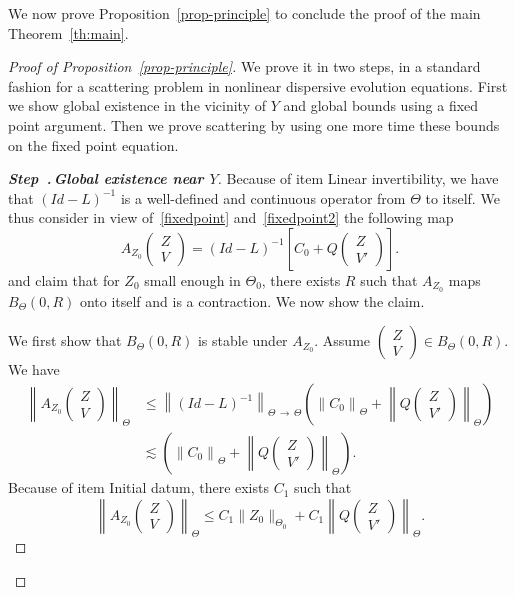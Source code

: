 \documentclass[10pt]{amsart}
\theoremstyle{definition}\newtheorem{defi}[theo]{Definition}\newtheorem{rema}[theo]{Remark}\newtheorem{exam}[theo]{Example}\newtheorem{exem}[theo]{Example}\newtheorem{nota}[theo]{Notation}
\newcounter{stepcount}
\newenvironment{step}[1]{\refstepcounter{stepcount}\begin{proof}[{\bf{Step~\thestepcount}{.\,\emph{#1}}}]}{\let\qed\relax\end{proof}}
\begin{document}
\vspace{4pt}
We now prove Proposition~\ref{prop-principle} to conclude the proof of the main Theorem~\ref{th:main}.


\begin{proof}[Proof of Proposition~\ref{prop-principle}]
We prove it in two steps, in a standard fashion for a scattering problem in nonlinear dispersive evolution equations. First we show global existence in the vicinity of $Y$ and global bounds using a fixed point argument. Then we prove scattering by using one more time these bounds on the fixed point equation.

\begin{step}{{Global existence near $Y$}}\label{proofpro3.1step1}
Because of item Linear invertibility, we have that $(Id-L)^{-1}$ is a well-defined and continuous operator from $\Theta$ to itself. We thus consider in view of~\eqref{fixedpoint} and~\eqref{fixedpoint2} the following map
\begin{equation} \label{id:fixedpointmainth}
A_{Z_0}
\begin{pmatrix} Z \\V
\end{pmatrix} = (Id-L)^{-1} \left[C_0 + Q
\begin{pmatrix} Z \\V'
\end{pmatrix} \right].
\end{equation}
and claim that for $Z_0$ small enough in $\Theta_0$, there exists $R$ such that $A_{Z_0}$ maps $B_{\Theta}(0,R)$ onto itself and is a contraction. We now show the claim.

We first show that $B_{\Theta}(0,R)$ is stable under $A_{Z_0}$. Assume $
(\begin{smallmatrix} Z \\V
\end{smallmatrix}) \in B_\Theta (0,R)$. We have
\begin{align*}
\left\| A_{Z_0}
\begin{pmatrix} Z \\V
\end{pmatrix} \right\|_{\Theta} &\leq \left\|(Id-L)^{-1}\right\|_{\Theta\,\rightarrow\,\Theta} \left(\left\|C_0\right\|_\Theta + \left\| Q
\begin{pmatrix}
Z \\V'
\end{pmatrix} 
\right\|_\Theta \right)\\
&\lesssim \left(\left\|C_0\right\|_\Theta + \left\| Q
\begin{pmatrix}
Z \\V'
\end{pmatrix} \right\|_\Theta \right).
\end{align*}
Because of item Initial datum, there exists $C_1$ such that
\[
\left\| A_{Z_0}
\begin{pmatrix}
Z \\V
\end{pmatrix} \right\|_{\Theta} \leq C_1 \|Z_0\|_{\Theta_0} +C_1\left\| Q
\begin{pmatrix}
Z \\V'
\end{pmatrix} \right\|_\Theta.
\]


\end{step}
\end{proof}
\end{document}
